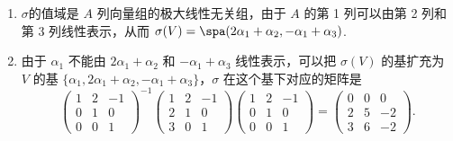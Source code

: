 \begin{solution}
\begin{enumerate}
        \item  $\sigma$的值域是 $A$ 列向量组的极大线性无关组，由于 $ A $ 的第 1 列可以由第 2 列和第 3 列线性表示，从而 $\sigma(V)=\spa(2 \alpha_{1}+\alpha_{2}, -\alpha_{1}+\alpha_{3})$.

        \item 由于 $\alpha_{1}$ 不能由 $2 \alpha_{1}+\alpha_{2}$ 和 $-\alpha_{1}+\alpha_{3}$ 线性表示，可以把 $\sigma(V)$ 的基扩充为 $V$ 的基 $\{\alpha_{1}, 2 \alpha_{1}+\alpha_{2}, -\alpha_{1}+\alpha_{3}\}$，$\sigma$ 在这个基下对应的矩阵是
              \[\begin{pmatrix}
                      1 & 2 & -1 \\
                      0 & 1 & 0  \\
                      0 & 0 & 1
                  \end{pmatrix}^{-1}\begin{pmatrix}
                      1 & 2 & -1 \\
                      2 & 1 & 0  \\
                      3 & 0 & 1
                  \end{pmatrix}\begin{pmatrix}
                      1 & 2 & -1 \\
                      0 & 1 & 0  \\
                      0 & 0 & 1
                  \end{pmatrix}=\begin{pmatrix}
                      0 & 0 & 0  \\
                      2 & 5 & -2 \\
                      3 & 6 & -2
                  \end{pmatrix}.\]


\end{enumerate}
\end{solution}
